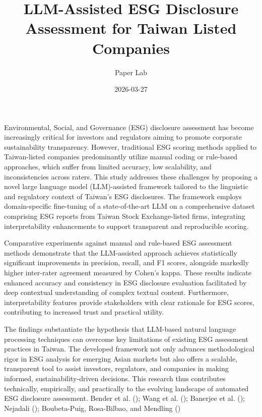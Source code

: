 \documentclass[
  12pt,
]{article}
\title{LLM-Assisted ESG Disclosure Assessment for Taiwan Listed
Companies}
\author{Paper Lab}
\date{2026-03-27}
\begin{document}
\maketitle


Environmental, Social, and Governance (ESG) disclosure assessment has
become increasingly critical for investors and regulators aiming to
promote corporate sustainability transparency. However, traditional ESG
scoring methods applied to Taiwan-listed companies predominantly utilize
manual coding or rule-based approaches, which suffer from limited
accuracy, low scalability, and inconsistencies across raters. This study
addresses these challenges by proposing a novel large language model
(LLM)-assisted framework tailored to the linguistic and regulatory
context of Taiwan's ESG disclosures. The framework employs
domain-specific fine-tuning of a state-of-the-art LLM on a comprehensive
dataset comprising ESG reports from Taiwan Stock Exchange-listed firms,
integrating interpretability enhancements to support transparent and
reproducible scoring.

Comparative experiments against manual and rule-based ESG assessment
methods demonstrate that the LLM-assisted approach achieves
statistically significant improvements in precision, recall, and F1
scores, alongside markedly higher inter-rater agreement measured by
Cohen's kappa. These results indicate enhanced accuracy and consistency
in ESG disclosure evaluation facilitated by deep contextual
understanding of complex textual content. Furthermore, interpretability
features provide stakeholders with clear rationale for ESG scores,
contributing to increased trust and practical utility.

The findings substantiate the hypothesis that LLM-based natural language
processing techniques can overcome key limitations of existing ESG
assessment practices in Taiwan. The developed framework not only
advances methodological rigor in ESG analysis for emerging Asian markets
but also offers a scalable, transparent tool to assist investors,
regulators, and companies in making informed, sustainability-driven
decisions. This research thus contributes technically, empirically, and
practically to the evolving landscape of automated ESG disclosure
assessment. Bender et al. (); Wang et al.
(); Banerjee et al.
(); Nejadali
(); Boubeta-Puig, Rosa-Bilbao, and
Mendling ()
\end{document}
